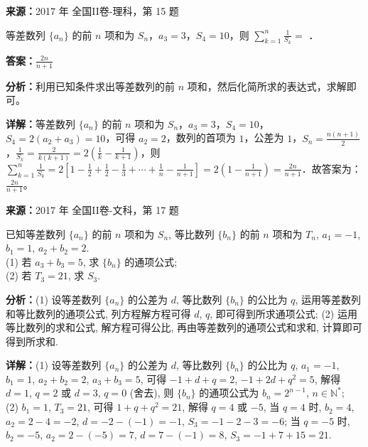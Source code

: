\begin{question}[points=5]
\textbf{来源：}2017 年 全国II卷-理科，第 15 题\par
等差数列 $\{a_n\}$ 的前 $n$ 项和为 $S_n$，$a_3=3$，$S_4=10$，则 $\sum_{k=1}^{n}\frac{1}{S_k}=$ ．
\fillin[{$\frac{2n}{n+1}$}]
\begin{solution}
\textbf{答案：}$\frac{2n}{n+1}$

\textbf{分析：}利用已知条件求出等差数列的前 $n$ 项和，然后化简所求的表达式，求解即可。

\textbf{详解：}等差数列 $\{a_n\}$ 的前 $n$ 项和为 $S_n$，$a_3=3$，$S_4=10$，$S_4=2(a_2+a_3)=10$，可得 $a_2=2$，数列的首项为 $1$，公差为 $1$，$S_n=\frac{n(n+1)}{2}$，$\frac{1}{S_k}=\frac{2}{k(k+1)}=2(\frac{1}{k}-\frac{1}{k+1})$，则 $\sum_{k=1}^{n}\frac{1}{S_k}=2[1-\frac{1}{2}+\frac{1}{2}-\frac{1}{3}+\cdots+\frac{1}{n}-\frac{1}{n+1}]=2(1-\frac{1}{n+1})=\frac{2n}{n+1}$．故答案为：$\frac{2n}{n+1}$。
\end{solution}
\end{question}

\begin{question}[points=12]
\textbf{来源：}2017 年 全国II卷-文科，第 17 题\par
已知等差数列 $\{a_n\}$ 的前 $n$ 项和为 $S_n$, 等比数列 $\{b_n\}$ 的前 $n$ 项和为 $T_n$, $a_1=-1$, $b_1=1$, $a_2+b_2=2$. \\ (1) 若 $a_3+b_3=5$, 求 $\{b_n\}$ 的通项公式; \\ (2) 若 $T_3=21$, 求 $S_3$.
\begin{solution}

\textbf{分析：}(1) 设等差数列 $\{a_n\}$ 的公差为 $d$, 等比数列 $\{b_n\}$ 的公比为 $q$, 运用等差数列和等比数列的通项公式, 列方程解方程可得 $d$, $q$, 即可得到所求通项公式; (2) 运用等比数列的求和公式, 解方程可得公比, 再由等差数列的通项公式和求和, 计算即可得到所求和.

\textbf{详解：}(1) 设等差数列 $\{a_n\}$ 的公差为 $d$, 等比数列 $\{b_n\}$ 的公比为 $q$, $a_1=-1$, $b_1=1$, $a_2+b_2=2$, $a_3+b_3=5$, 可得 $-1+d+q=2$, $-1+2d+q^2=5$, 解得 $d=1$, $q=2$ 或 $d=3$, $q=0$ (舍去), 则 $\{b_n\}$ 的通项公式为 $b_n=2^{n-1}$, $n\in\mathbb{N}^*$; \\ (2) $b_1=1$, $T_3=21$, 可得 $1+q+q^2=21$, 解得 $q=4$ 或 $-5$, 当 $q=4$ 时, $b_2=4$, $a_2=2-4=-2$, $d=-2-(-1)=-1$, $S_3=-1-2-3=-6$; 当 $q=-5$ 时, $b_2=-5$, $a_2=2-(-5)=7$, $d=7-(-1)=8$, $S_3=-1+7+15=21$.
\end{solution}
\end{question}

